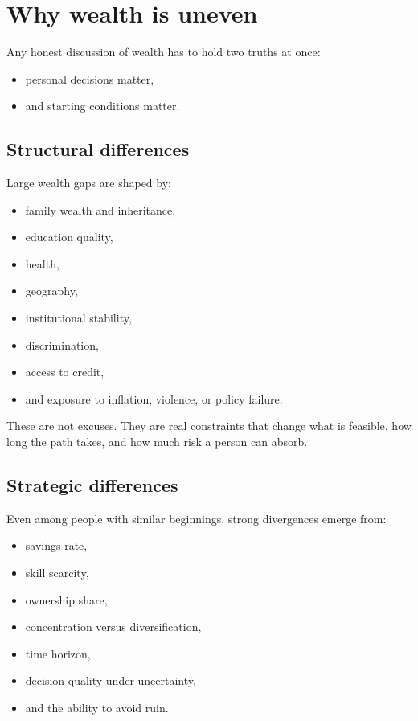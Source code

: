 \documentclass[11pt,openany]{book}
\begin{document}
\chapter{Why wealth is uneven}

Any honest discussion of wealth has to hold two truths at once:

\begin{itemize}
  \item personal decisions matter,
  \item and starting conditions matter.
\end{itemize}

\section{Structural differences}

Large wealth gaps are shaped by:

\begin{itemize}
  \item family wealth and inheritance,
  \item education quality,
  \item health,
  \item geography,
  \item institutional stability,
  \item discrimination,
  \item access to credit,
  \item and exposure to inflation, violence, or policy failure.
\end{itemize}

These are not excuses. They are real constraints that change what is feasible, how long the path takes, and how much risk a person can absorb.

\section{Strategic differences}

Even among people with similar beginnings, strong divergences emerge from:

\begin{itemize}
  \item savings rate,
  \item skill scarcity,
  \item ownership share,
  \item concentration versus diversification,
  \item time horizon,
  \item decision quality under uncertainty,
  \item and the ability to avoid ruin.
\end{itemize}
\end{document}
